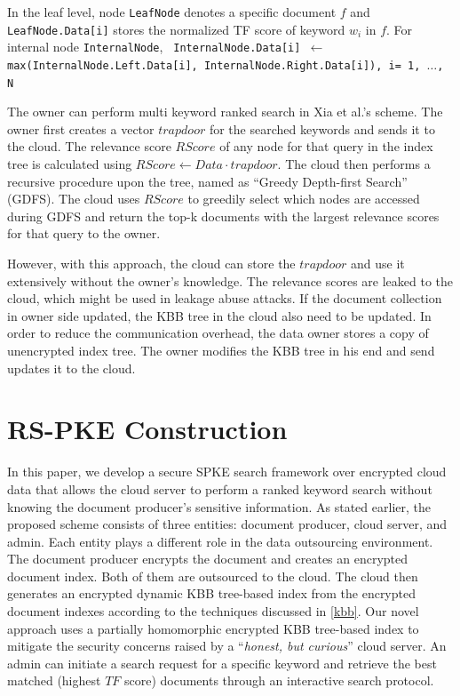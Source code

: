 \documentclass[sigconf,pdftex]{acmart}
\begin{document}
In the leaf level, node \texttt{LeafNode} denotes a specific document $f$ and \texttt{LeafNode.Data[i]} stores the normalized TF score of keyword $w_i$ in $f$. For internal node \texttt{InternalNode},
\newline\texttt{
    InternalNode.Data[i] $\xleftarrow{}$ max(InternalNode.Left.Data[i], InternalNode.Right.Data[i]), i= 1, $\dots$, N
    }



The owner can perform multi keyword ranked search in Xia et al.'s scheme. The owner first creates a vector $trapdoor$ for the searched keywords and sends it to the cloud. The relevance score $RScore$ of any node for that query in the index tree is calculated using $RScore \xleftarrow{} Data \cdot trapdoor$. The cloud then performs a recursive procedure upon the tree, named as “Greedy Depth-first Search” (GDFS). The cloud uses $RScore$  to greedily select which nodes are accessed during GDFS and return the top-k documents with the largest relevance scores for that query to the owner. 

However, with this approach, the cloud can store the $trapdoor$ and use it extensively without the owner's knowledge. The relevance scores are leaked to the cloud, which might be used in leakage abuse attacks. If the document collection in owner side updated, the KBB tree in the cloud also need to be updated. In order to
reduce the communication overhead, the data owner
stores a copy of unencrypted index tree. The owner modifies the KBB tree in his end and send updates it to the cloud.


\section{RS-PKE Construction}\label{proposed}




In this paper, we develop a secure SPKE search framework over encrypted cloud data that allows the cloud server to perform a ranked keyword search without knowing the document producer's sensitive information. As stated earlier, the proposed scheme consists of three entities: document producer, cloud server, and admin. Each entity plays a different role in the data outsourcing environment. The document producer encrypts the document and creates an encrypted document index. Both of them are outsourced to the cloud. The cloud then generates an encrypted dynamic KBB tree-based index from the encrypted document indexes according to the techniques discussed in \ref{kbb}. Our novel approach uses a partially homomorphic encrypted KBB tree-based index to mitigate the security concerns raised by a ``\textit{honest, but curious}'' cloud server. An admin can initiate a search request for a specific keyword and retrieve the best matched (highest $TF$ score) documents through an interactive search protocol. 
\end{document}

